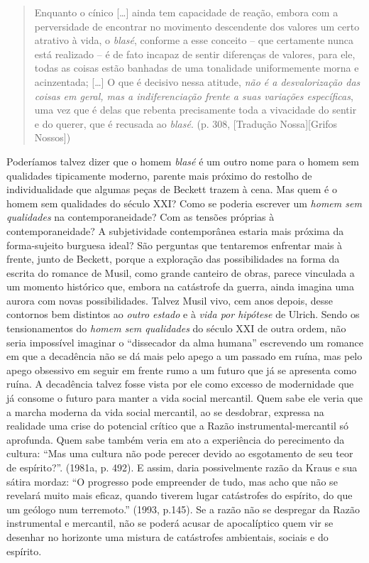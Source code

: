 \begin{quote}
Enquanto o cínico {[}\ldots{}{]} ainda tem capacidade de reação, embora
com a perversidade de encontrar no movimento descendente dos valores um
certo atrativo à vida, o \emph{blasé}, conforme a esse conceito -- que
certamente nunca está realizado -- é de fato incapaz de sentir
diferenças de valores, para ele, todas as coisas estão banhadas de uma
tonalidade uniformemente morna e acinzentada; {[}\ldots{}{]} O que é
decisivo nessa atitude, \emph{não é a desvalorização das coisas em
geral, mas a indiferenciação frente a suas variações específicas}, uma
vez que é delas que rebenta precisamente toda a vivacidade do sentir e
do querer, que é recusada ao \emph{blasé}. (p. 308, {[}Tradução
Nossa{]}{[}Grifos Nossos{]})
\end{quote}

Poderíamos talvez dizer que o homem \emph{blasé} é um outro nome para o
homem sem qualidades tipicamente moderno, parente mais próximo do
restolho de individualidade que algumas peças de Beckett trazem à cena.
Mas quem é o homem sem qualidades do século XXI? Como se poderia
escrever um \emph{homem sem qualidades} na contemporaneidade? Com as
tensões próprias à contemporaneidade? A subjetividade contemporânea
estaria mais próxima da forma-sujeito burguesa ideal? São perguntas que
tentaremos enfrentar mais à frente, junto de Beckett, porque a
exploração das possibilidades na forma da escrita do romance de Musil,
como grande canteiro de obras, parece vinculada a um momento histórico
que, embora na catástrofe da guerra, ainda imagina uma aurora com novas
possibilidades. Talvez Musil vivo, cem anos depois, desse contornos bem
distintos ao \emph{outro estado} e à \emph{vida por hipótese} de Ulrich.
Sendo os tensionamentos do \emph{homem sem qualidades} do século XXI de
outra ordem, não seria impossível imaginar o ``dissecador da alma
humana'' escrevendo um romance em que a decadência não se dá mais pelo
apego a um passado em ruína, mas pelo apego obsessivo em seguir em
frente rumo a um futuro que já se apresenta como ruína. A decadência
talvez fosse vista por ele como excesso de modernidade que já consome o
futuro para manter a vida social mercantil. Quem sabe ele veria que a
marcha moderna da vida social mercantil, ao se desdobrar, expressa na
realidade uma crise do potencial crítico que a Razão
instrumental-mercantil só aprofunda. Quem sabe também veria em ato a
experiência do perecimento da cultura: ``Mas uma cultura não pode
perecer devido ao esgotamento de seu teor de espírito?''. (1981a, p.
492). E assim, daria possivelmente razão da Kraus e sua sátira mordaz:
``O progresso pode empreender de tudo, mas acho que não se revelará
muito mais eficaz, quando tiverem lugar catástrofes do espírito, do que
um geólogo num terremoto.'' (1993, p.145). Se a razão não se despregar
da Razão instrumental e mercantil, não se poderá acusar de apocalíptico
quem vir se desenhar no horizonte uma mistura de catástrofes ambientais,
sociais e do espírito.

